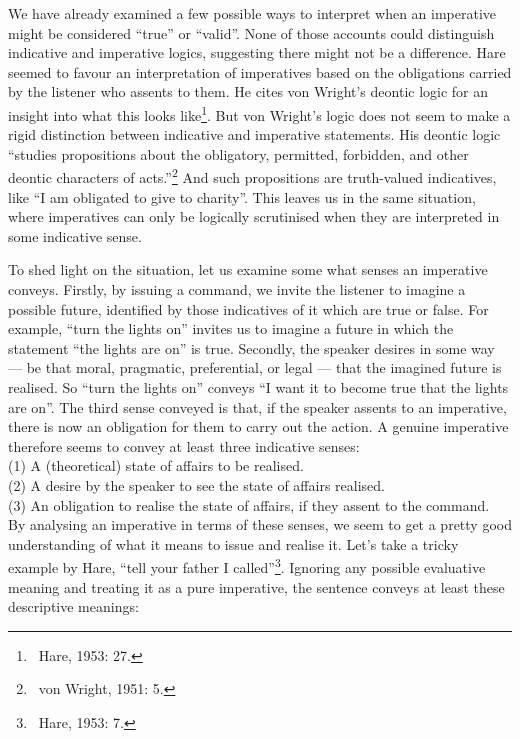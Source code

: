 \documentclass[12pt]{article}
\begin{document}
We have already examined a few possible ways to interpret when an imperative might be considered ``true'' or ``valid''. None of those accounts could distinguish indicative and imperative logics, suggesting there might not be a difference. Hare seemed to favour an interpretation of imperatives based on the obligations carried by the listener who assents to them. He cites von Wright's deontic logic for an insight into what this looks like\footnote{~Hare, 1953: 27.}. But von Wright's logic does not seem to make a rigid distinction between indicative and imperative statements. His deontic logic ``studies propositions about the obligatory, permitted, forbidden, and other deontic characters of acts.''\footnote{~von Wright, 1951: 5.} And such propositions are truth-valued indicatives, like ``I am obligated to give to charity''. This leaves us in the same situation, where imperatives can only be logically scrutinised when they are interpreted in some indicative sense.

To shed light on the situation, let us examine some what senses an imperative conveys. Firstly, by issuing a command, we invite the listener to imagine a possible future, identified by those indicatives of it which are true or false. For example, ``turn the lights on'' invites us to imagine a future in which the statement ``the lights are on'' is true. Secondly, the speaker desires in some way --- be that moral, pragmatic, preferential, or legal --- that the imagined future is realised. So ``turn the lights on'' conveys ``I want it to become true that the lights are on''. The third sense conveyed is that, if the speaker assents to an imperative, there is now an obligation for them to carry out the action. A genuine imperative therefore seems to convey at least three indicative senses:\\

(1) A (theoretical) state of affairs to be realised.\\
\indent
(2) A desire by the speaker to see the state of affairs realised.\\
\indent
(3) An obligation to realise the state of affairs, if they assent to the command.
\\

By analysing an imperative in terms of these senses, we seem to get a pretty good understanding of what it means to issue and realise it. Let's take a tricky example by Hare, ``tell your father I called''\footnote{~Hare, 1953: 7.}. Ignoring any possible evaluative meaning and treating it as a pure imperative, the sentence conveys at least these descriptive meanings:\\
\end{document}
